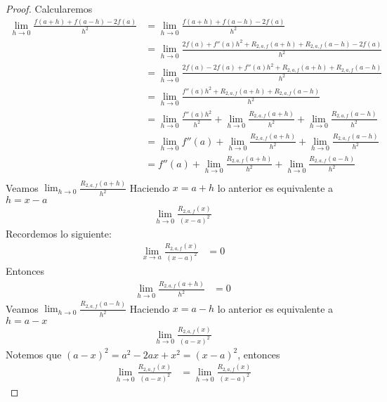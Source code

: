 \documentclass[a4paper]{article}
\begin{document}
\begin{proof}
    Calcularemos 
    \begin{align*}
        \lim_{h \to 0} \frac{f(a + h) + f(a - h) -2f(a)}{h^2} &= \lim_{h \to 0} \frac{f(a + h) + f(a - h) -2f(a)}{h^2} \\
        &= \lim_{h \to 0} \frac{2f(a) + f''(a)h^2 + R_{2, a, f}(a + h) + R_{2, a, f}(a - h) - 2f(a)}{h^2} \\
        &= \lim_{h \to 0} \frac{2f(a) - 2f(a) + f''(a)h^2 + R_{2, a, f}(a + h) + R_{2, a, f}(a - h)}{h^2} \\
        &= \lim_{h \to 0} \frac{f''(a)h^2 + R_{2, a, f}(a + h) + R_{2, a, f}(a - h)}{h^2} \\
        &= \lim_{h \to 0} \frac{f''(a)h^2}{h^2} + \lim_{h \to 0} \frac{R_{2, a, f}(a + h)}{h^2} + \lim_{h \to 0} \frac{R_{2, a, f}(a - h)}{h^2}  \\
        &= \lim_{h \to 0} f''(a) + \lim_{h \to 0} \frac{R_{2, a, f}(a + h)}{h^2} + \lim_{h \to 0} \frac{R_{2, a, f}(a - h)}{h^2}  \\
        &= f''(a) + \lim_{h \to 0} \frac{R_{2, a, f}(a + h)}{h^2} + \lim_{h \to 0} \frac{R_{2, a, f}(a - h)}{h^2}  \\
    \end{align*}
    Veamos \(\displaystyle\lim_{h \to 0} \frac{R_{2, a, f}(a + h)}{h^2}\)
    \newline 
    Haciendo \(x = a + h\) lo anterior es equivalente a \(h = x - a\)
    \begin{align*}
        \lim_{h \to 0} \frac{R_{2, a, f}(x)}{(x - a)^2} 
    \end{align*}
    Recordemos lo siguiente:
    \begin{align*}
        \lim_{x \to a} \frac{R_{2, a, f}(x)}{(x - a)^2} &=  0
    \end{align*}
    Entonces 
    \begin{align*}
        \lim_{h \to 0} \frac{R_{2, a, f}(a + h)}{h^2} &= 0
    \end{align*}
    Veamos \(\displaystyle\lim_{h \to 0} \frac{R_{2, a, f}(a - h)}{h^2}\)
    \newline 
    Haciendo \(x = a - h\) lo anterior es equivalente a \(h = a - x\)
    \begin{align*}
        \lim_{h \to 0} \frac{R_{2, a, f}(x)}{(a - x)^2} 
    \end{align*}
    Notemos que \((a - x)^2 = a^2 - 2ax + x^2 = (x - a)^2\), entonces 
    \begin{align*}
        \lim_{h \to 0} \frac{R_{2, a, f}(x)}{(a - x)^2} &= \lim_{h \to 0} \frac{R_{2, a, f}(x)}{(x - a)^2} 

\end{align*}
\end{proof}
\end{document}
